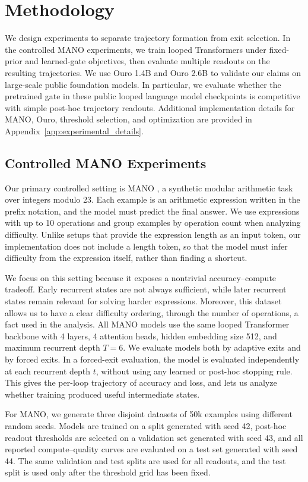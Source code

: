 \documentclass[10pt]{article} %
\begin{document}
\section{Methodology}
We design experiments to separate trajectory formation from exit selection. In the controlled MANO experiments, we train looped Transformers under fixed-prior and learned-gate objectives, then evaluate multiple readouts on the resulting trajectories. We use Ouro 1.4B and Ouro 2.6B to validate our claims on large-scale public foundation models. In particular, we evaluate whether the pretrained gate in these public looped language model checkpoints is competitive with simple post-hoc trajectory readouts. Additional implementation details for MANO, Ouro, threshold selection, and optimization are provided in Appendix~\ref{app:experimental_details}.

\subsection{Controlled MANO Experiments}
Our primary controlled setting is MANO \citep{allenzhu2025physicslanguagemodels41}, a synthetic modular arithmetic task over integers modulo 23. Each example is an arithmetic expression written in the prefix notation, and the model must predict the final answer. We use expressions with up to 10 operations and group examples by operation count when analyzing difficulty. Unlike setups that provide the expression length as an input token, our implementation does not include a length token, so that the model must infer difficulty from the expression itself, rather than finding a shortcut.

We focus on this setting because it exposes a nontrivial accuracy--compute tradeoff. Early recurrent states are not always sufficient, while later recurrent states remain relevant for solving harder expressions. Moreover, this dataset allows us to have a clear difficulty ordering, through the number of operations, a fact used in the analysis. All MANO models use the same looped Transformer backbone with 4 layers, 4 attention heads, hidden embedding size 512, and maximum recurrent depth \(T=6\). We evaluate models both by adaptive exits and by forced exits. In a forced-exit evaluation, the model is evaluated independently at each recurrent depth \(t\), without using any learned or post-hoc stopping rule. This gives the per-loop trajectory of accuracy and loss, and lets us analyze whether training produced useful intermediate states.

For MANO, we generate three disjoint datasets of 50k examples using different random seeds. Models are trained on a split generated with seed 42, post-hoc readout thresholds are selected on a validation set generated with seed 43, and all reported compute--quality curves are evaluated on a test set generated with seed 44. The same validation and test splits are used for all readouts, and the test split is used only after the threshold grid has been fixed.
\end{document}
